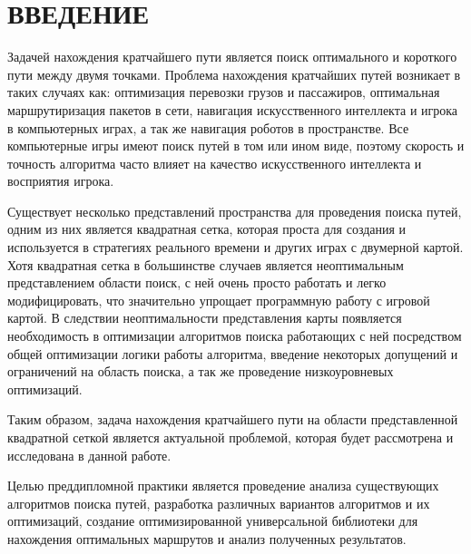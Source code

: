 \section*{ВВЕДЕНИЕ}

\vspace{1\baselineskip} 

Задачей нахождения кратчайшего пути является поиск оптимального и короткого пути между двумя точками. Проблема нахождения кратчайших путей возникает в таких случаях как: оптимизация перевозки грузов и пассажиров, оптимальная маршрутиризация пакетов в сети, навигация искусственного интеллекта и игрока в компьютерных играх, а так же навигация роботов в пространстве. Все компьютерные игры имеют поиск путей в том или ином виде, поэтому скорость и точность алгоритма часто влияет на качество искусственного интеллекта и восприятия игрока. 

Существует несколько представлений пространства для проведения поиска путей, одним из них является квадратная сетка, которая проста для создания и используется в стратегиях реального времени и других играх с двумерной картой. Хотя квадратная сетка в большинстве случаев является неоптимальным представлением области поиск, с ней очень просто работать и легко модифицировать, что значительно упрощает программную работу с игровой картой. В следствии неоптимальности представления карты появляется необходимость в оптимизации алгоритмов поиска работающих с ней посредством общей оптимизации логики работы алгоритма, введение некоторых допущений и ограничений на область поиска, а так же проведение низкоуровневых оптимизаций.

Таким образом, задача нахождения кратчайшего пути на области представленной квадратной сеткой является актуальной проблемой, которая будет рассмотрена и исследована в данной работе.

Целью преддипломной практики является проведение анализа существующих алгоритмов поиска путей, разработка различных вариантов алгоритмов и их оптимизаций, создание оптимизированной универсальной библиотеки для нахождения оптимальных маршрутов и анализ полученных результатов.

